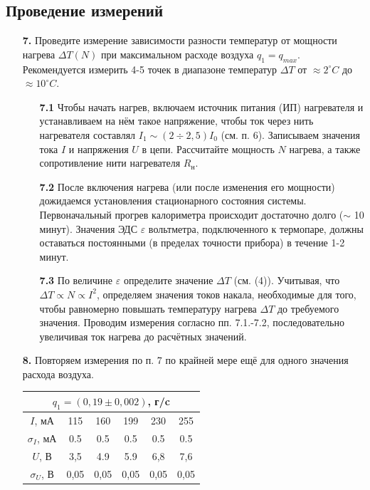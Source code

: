 \documentclass[a4paper, 12pt]{article}%
\begin{document}
\subsection*{Проведение измерений}
\begin{enumerate}
\item [\textbf{7.}]Проведите измерение зависимости разности температур от мощности нагрева $\Delta T (N)$ при максимальном расходе воздуха $q_1 = q_{max}$. Рекомендуется измерить 4-5 точек в диапазоне температур $\Delta T$ от $\approx 2^{\circ}C$ до $\approx 10^{\circ}C$.
\begin{enumerate}
\item [\textbf{7.1}] Чтобы начать нагрев, включаем источник питания (ИП) нагревателя и устанавливаем на нём такое напряжение, чтобы ток через нить нагревателя составлял $I_1 \sim (2 \div 2,5)I_0$ (см. п. 6). Записываем значения тока $I$ и напряжения $U$ в цепи. Рассчитайте мощность $N$ нагрева, а также сопротивление нити нагревателя $R_{\text{н}}$.
\item [\textbf{7.2}] После включения нагрева (или после изменения его мощности) дожидаемся установления стационарного состояния системы. Первоначальный прогрев калориметра происходит достаточно долго ($\sim$ 10 минут). Значения ЭДС $\varepsilon$ вольтметра, подключенного к термопаре, должны оставаться постоянными (в пределах точности прибора) в течение 1-2 минут.
\item [\textbf{7.3}] По величине $\varepsilon$ определите значение $\Delta T$ (см. (4)). Учитывая, что $\Delta T \varpropto N \varpropto I^2$, определяем значения токов накала, необходимые для того, чтобы равномерно повышать температуру нагрева $\Delta T$ до требуемого значения. Проводим измерения согласно пп. 7.1.-7.2, последовательно увеличивая ток нагрева до расчётных значений.
\end{enumerate}
\item [\textbf{8.}] Повторяем измерения по п. 7 по крайней мере ещё для одного значения расхода воздуха.
\begin{center}
\begin{tabular}{|c|c|c|c|c|c|}
\hline
\multicolumn{6}{|c|}{$q_1 = (0,19 \pm0,002)$, г/c} \\ \hline
$I$, мА & 115 & 160 & 199 & 230 & 255 \\ \hline
$\sigma_I$, мА & 0.5 & 0.5 & 0.5 & 0.5 & 0.5 \\ \hline
$U$, В & 3,5 & 4.9 & 5.9 & 6,8 & 7,6 \\ \hline
$\sigma_U$, В & 0,05 & 0,05 & 0,05 & 0,05 & 0,05 \\ \hline

\end{tabular}
\end{center}
\end{enumerate}
\end{document}
